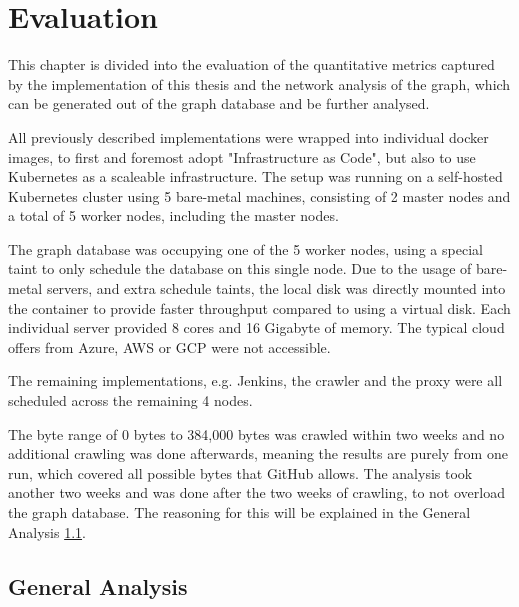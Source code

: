 \chapter{Evaluation}
\label{sec:evaluation}

This chapter is divided into the evaluation of the quantitative metrics captured by the implementation of this thesis and the network analysis of the graph, which can be generated out of the graph database and be further analysed.

All previously described implementations were wrapped into individual docker images, to first and foremost adopt "Infrastructure as Code", but also to use Kubernetes as a scaleable infrastructure. The setup was running on a self-hosted Kubernetes cluster using 5 bare-metal machines, consisting of 2 master nodes and a total of 5 worker nodes, including the master nodes.

The graph database was occupying one of the 5 worker nodes, using a special taint to only schedule the database on this single node. Due to the usage of bare-metal servers, and extra schedule taints, the local disk was directly mounted into the container to provide faster throughput compared to using a virtual disk. Each individual server provided 8 cores and 16 Gigabyte of memory. The typical cloud offers from Azure, AWS or GCP were not accessible.

The remaining implementations, e.g. Jenkins, the crawler and the proxy were all scheduled across the remaining 4 nodes.

The byte range of 0 bytes to 384,000 bytes was crawled within two weeks and no additional crawling was done afterwards, meaning the results are purely from one run, which covered all possible bytes that GitHub allows. The analysis took another two weeks and was done after the two weeks of crawling, to not overload the graph database. The reasoning for this will be explained in the General Analysis \ref{sec:general_analysis}.

\section{General Analysis}
\label{sec:general_analysis}

